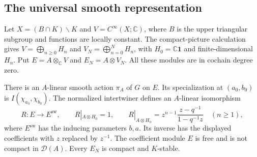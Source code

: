 \subsection{The universal smooth representation}

Let $X=(B\cap K)\backslash K$ and $V=C^\infty(X;\mathbb C)$,
where $B$ is the upper triangular subgroup and functions are locally constant.
The compact-picture calculation gives
$V=\bigoplus_{n\ge0}H_n$ and $V_N=\bigoplus_{n=0}^NH_n$,
with $H_0=\mathbb C\mathbf1$ and finite-dimensional $H_n$.
Put $E=A\otimes_{\mathbb C}V$ and $E_N=A\otimes V_N$.
All these modules are in cochain degree zero.

\begin{proposition}
\label{v4-arith:ic:eis:parameter-induction}
There is an $A$-linear smooth action $\pi_A$ of $G$ on $E$.
Its specialization at $(a_0,b_0)$ is $I(\chi_{a_0},\chi_{b_0})$.
The normalized intertwiner defines an $A$-linear isomorphism
\[
 R:E\longrightarrow E^{\mathrm{sw}},\qquad
 R|_{A\otimes H_0}=1,\qquad
 R|_{A\otimes H_n}=z^{n-1}\frac{z-q^{-1}}{1-q^{-1}z}\quad(n\ge1),
\]
where $E^{\mathrm{sw}}$ has the inducing parameters $b,a$.
Its inverse has the displayed coefficients with $z$ replaced by $z^{-1}$.
The coefficient module $E$ is free and is not compact in $\mathcal D(A)$.
Every $E_N$ is compact and $K$-stable.
\end{proposition}


